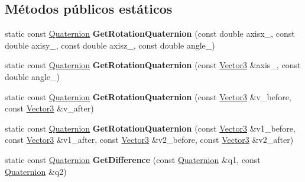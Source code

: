 \subsection*{\-Métodos públicos estáticos}
\begin{DoxyCompactItemize}
\item 
\hypertarget{classdfv_1_1Quaternion_aebdc8b3a1ee83f05dbde912ea9b95a9b}{static const \hyperlink{classdfv_1_1Quaternion}{\-Quaternion} {\bfseries \-Get\-Rotation\-Quaternion} (const double axisx\-\_\-, const double axisy\-\_\-, const double axisz\-\_\-, const double angle\-\_\-)}\label{classdfv_1_1Quaternion_aebdc8b3a1ee83f05dbde912ea9b95a9b}

\item 
\hypertarget{classdfv_1_1Quaternion_a8489d367867c77e11af2a3f90e255f11}{static const \hyperlink{classdfv_1_1Quaternion}{\-Quaternion} {\bfseries \-Get\-Rotation\-Quaternion} (const \hyperlink{classdfv_1_1Vector3}{\-Vector3} \&axis\-\_\-, const double angle\-\_\-)}\label{classdfv_1_1Quaternion_a8489d367867c77e11af2a3f90e255f11}

\item 
\hypertarget{classdfv_1_1Quaternion_a143a2f9d6a4abf915d7c7b5d4044d794}{static const \hyperlink{classdfv_1_1Quaternion}{\-Quaternion} {\bfseries \-Get\-Rotation\-Quaternion} (const \hyperlink{classdfv_1_1Vector3}{\-Vector3} \&v\-\_\-before, const \hyperlink{classdfv_1_1Vector3}{\-Vector3} \&v\-\_\-after)}\label{classdfv_1_1Quaternion_a143a2f9d6a4abf915d7c7b5d4044d794}

\item 
\hypertarget{classdfv_1_1Quaternion_a132842850bff71f69fc594da825e7f61}{static const \hyperlink{classdfv_1_1Quaternion}{\-Quaternion} {\bfseries \-Get\-Rotation\-Quaternion} (const \hyperlink{classdfv_1_1Vector3}{\-Vector3} \&v1\-\_\-before, const \hyperlink{classdfv_1_1Vector3}{\-Vector3} \&v1\-\_\-after, const \hyperlink{classdfv_1_1Vector3}{\-Vector3} \&v2\-\_\-before, const \hyperlink{classdfv_1_1Vector3}{\-Vector3} \&v2\-\_\-after)}\label{classdfv_1_1Quaternion_a132842850bff71f69fc594da825e7f61}

\item 
\hypertarget{classdfv_1_1Quaternion_ac436ef8f5cb310a0b2c1aa40f693c961}{static const \hyperlink{classdfv_1_1Quaternion}{\-Quaternion} {\bfseries \-Get\-Difference} (const \hyperlink{classdfv_1_1Quaternion}{\-Quaternion} \&q1, const \hyperlink{classdfv_1_1Quaternion}{\-Quaternion} \&q2)}\label{classdfv_1_1Quaternion_ac436ef8f5cb310a0b2c1aa40f693c961}

\end{DoxyCompactItemize}
